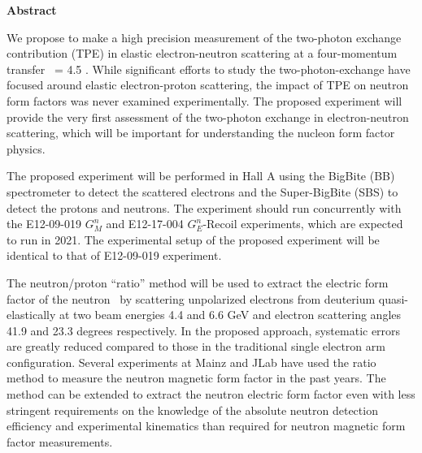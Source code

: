 \begin{center}
{{\large {\bf Abstract}}} 
\end{center}

We propose to make a high precision measurement of the two-photon exchange contribution (TPE) in elastic electron-neutron scattering at a four-momentum transfer \qsq~= 4.5 \gevcsq. 
While significant efforts to study the two-photon-exchange have focused around elastic electron-proton scattering, the impact of TPE on neutron form factors was never examined experimentally. 
The proposed experiment will provide the very first assessment of the two-photon exchange in electron-neutron scattering, which will be important for understanding the nucleon form factor physics. \par
The proposed experiment will be performed in Hall A using the BigBite (BB) spectrometer to detect the scattered electrons and the Super-BigBite (SBS) to detect the protons and neutrons. 
The experiment should run concurrently with the E12-09-019 $G_M^n$ and E12-17-004 $G_E^n$-Recoil experiments, which are expected to run in 2021. 
The experimental setup of the proposed experiment will be identical to that of E12-09-019 experiment. \par
The neutron/proton ``ratio'' method will be used to extract the electric form factor of the neutron \gen~by scattering unpolarized electrons from deuterium quasi-elastically at two beam energies 4.4 and 6.6 GeV and electron scattering angles 41.9 and 23.3 degrees respectively. 
In the proposed approach, systematic errors are greatly reduced compared to those in the traditional single electron arm configuration. 
Several experiments at Mainz and JLab have used the ratio method to measure the neutron magnetic form factor in the past years. 
The method can be extended to extract the neutron electric form factor even with less stringent requirements 
on the knowledge of the absolute neutron detection efficiency and experimental kinematics than required for neutron magnetic form factor measurements.  

